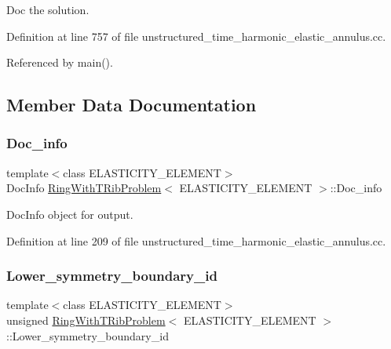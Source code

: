 Doc the solution. 



Definition at line 757 of file unstructured\+\_\+time\+\_\+harmonic\+\_\+elastic\+\_\+annulus.\+cc.



Referenced by main().



\subsection{Member Data Documentation}
\mbox{\label{classRingWithTRibProblem_a086bb927e3091b5d38e193b2ccb84e3b}} 
\subsubsection{\texorpdfstring{Doc\+\_\+info}{Doc\_info}}
{\footnotesize\ttfamily template$<$class E\+L\+A\+S\+T\+I\+C\+I\+T\+Y\+\_\+\+E\+L\+E\+M\+E\+NT$>$ \\
Doc\+Info \hyperlink{classRingWithTRibProblem}{Ring\+With\+T\+Rib\+Problem}$<$ E\+L\+A\+S\+T\+I\+C\+I\+T\+Y\+\_\+\+E\+L\+E\+M\+E\+NT $>$\+::Doc\+\_\+info\hspace{0.3cm}{\ttfamily [private]}}



Doc\+Info object for output. 



Definition at line 209 of file unstructured\+\_\+time\+\_\+harmonic\+\_\+elastic\+\_\+annulus.\+cc.

\mbox{\label{classRingWithTRibProblem_a93f5abb451b85f65316b930802c727f8}} 
\subsubsection{\texorpdfstring{Lower\+\_\+symmetry\+\_\+boundary\+\_\+id}{Lower\_symmetry\_boundary\_id}}
{\footnotesize\ttfamily template$<$class E\+L\+A\+S\+T\+I\+C\+I\+T\+Y\+\_\+\+E\+L\+E\+M\+E\+NT$>$ \\
unsigned \hyperlink{classRingWithTRibProblem}{Ring\+With\+T\+Rib\+Problem}$<$ E\+L\+A\+S\+T\+I\+C\+I\+T\+Y\+\_\+\+E\+L\+E\+M\+E\+NT $>$\+::Lower\+\_\+symmetry\+\_\+boundary\+\_\+id\hspace{0.3cm}{\ttfamily [private]}}



